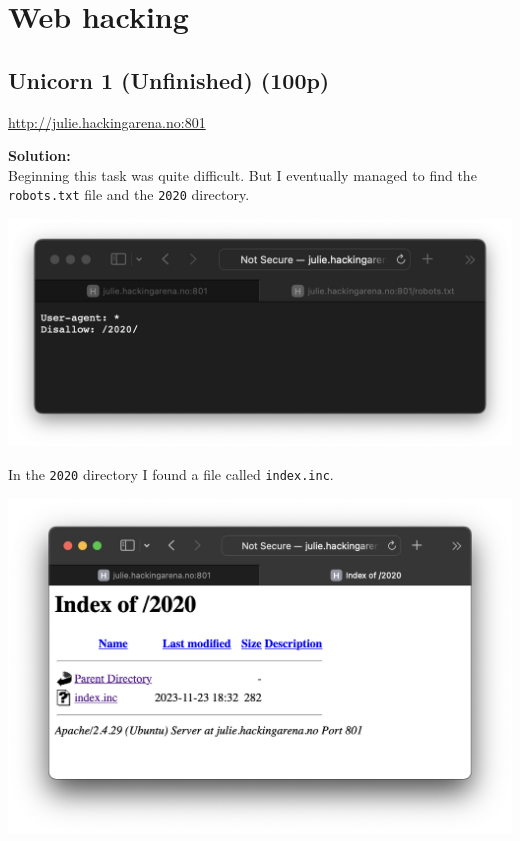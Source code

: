\section{Web hacking}

\subsection{Unicorn 1 (Unfinished) (100p)}
\addtocounter{unfinished}{100}
\url{http://julie.hackingarena.no:801}

\textbf{Solution:}\\
Beginning this task was quite difficult. 
But I eventually managed to find the \texttt{robots.txt} file and the \texttt{2020} directory.

\begin{center}
    \includegraphics[width=15cm]{img/Web hacking/Unicorn 1/Screenshot 2023-11-24 at 22.15.51.png}
\end{center}

In the \texttt{2020} directory I found a file called \texttt{index.inc}. 

\begin{center}
    \includegraphics[width=14cm]{img/Web hacking/Unicorn 1/Screenshot 2023-11-24 at 22.17.38.png}
\end{center}

